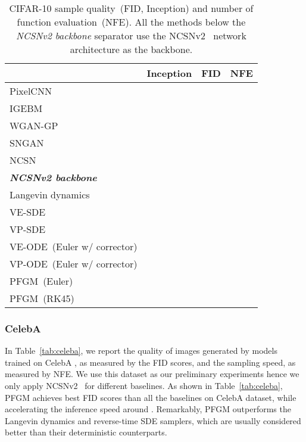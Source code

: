 \begin{table}[htbp]
\small
    \centering
    \caption{CIFAR-10 sample quality~(FID, Inception) and number of function evaluation~(NFE). All the methods below the \textit{NCSNv2 backbone} separator use the NCSNv2~\citep{Song2020ImprovedTF} network architecture as the backbone.}
    \begin{tabular}{l c c c}
    \toprule
         & Inception   &FID  & NFE \\
         \midrule
         PixelCNN~\citep{Oord2016ConditionalIG} &  &  & \\
        IGEBM~\citep{Du2019ImplicitGA} &  &  & \\
        WGAN-GP~\citep{Gulrajani2017ImprovedTO} &  & & \\
        SNGAN~\citep{Miyato2018SpectralNF} &  &  & \\
        NCSN~\citep{Song2019GenerativeMB} &  &  & \\
        \midrule
        \textit{\textbf{NCSNv2 backbone}}\\
        \midrule
        Langevin dynamics~\citep{Song2020ImprovedTF} &  &  & \\
        VE-SDE~\citep{Song2021ScoreBasedGM} & & &\\
        VP-SDE~\citep{Song2021ScoreBasedGM} & & &\\
        \midrule
VE-ODE~(Euler w/ corrector) &  &   &  \\
        VP-ODE~(Euler w/ corrector) &  &   &  \\
PFGM~(Euler)&   &   &  \\
PFGM~(RK45)&  &   &  \\
         \bottomrule
    \end{tabular}
    \label{tab:cifar-ncsnv2}
\end{table}


\subsubsection{CelebA}

In Table~\ref{tab:celeba}, we report the quality of images generated by models trained on CelebA , as measured by the FID scores, and the sampling speed, as measured
by NFE. We use this dataset as our preliminary experiments hence we only apply NCSNv2~\cite{Song2020ImprovedTF} for different baselines. As shown in Table~\ref{tab:celeba}, PFGM achieves best FID scores than all the baselines on CelebA dataset, while accelerating the inference speed around . Remarkably, PFGM outperforms the Langevin dynamics and reverse-time SDE samplers, which are usually considered better than their deterministic counterparts. 

